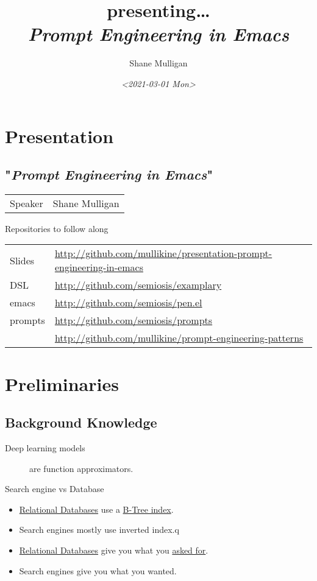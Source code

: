 \documentclass[presentation]{beamer}
\author{Shane Mulligan \\  }
\date{\textit{<2021-03-01 Mon>}}
\title{presenting\ldots{} \\   \emph{\alert{Prompt Engineering in Emacs}} \\  }
\begin{document}
\maketitle

\section{Presentation}
\label{sec:org67790be}
\subsection{"\emph{Prompt Engineering in Emacs}"}
\label{sec:org0ccc55f}
\begin{center}
\begin{tabular}{ll}
Speaker & Shane Mulligan\\
\end{tabular}
\end{center}

\begin{frame}[label={sec:org299757d}]{Repositories to follow along}
\begin{center}
\begin{tabular}{ll}
Slides & \url{http://github.com/mullikine/presentation-prompt-engineering-in-emacs}\\
DSL & \url{http://github.com/semiosis/examplary}\\
emacs & \url{http://github.com/semiosis/pen.el}\\
prompts & \url{http://github.com/semiosis/prompts}\\
 & \url{http://github.com/mullikine/prompt-engineering-patterns}\\
\end{tabular}
\end{center}
\end{frame}

\section{Preliminaries}
\label{sec:org44d37b2}
\subsection{Background Knowledge}
\label{sec:org04355f3}
\begin{description}
\item[{Deep learning models}] are function approximators.
\end{description}

\begin{frame}[label={sec:org3efe7c5}]{Search engine vs Database}
\begin{itemize}
\item \uline{Relational Databases} use a \uline{B-Tree index}.
\item \alert{Search engines} mostly use \alert{inverted index}.q
\item \uline{Relational Databases} give you what you \uline{asked for}.
\item \alert{Search engines} give you what you \alert{wanted}.
\end{itemize}
\end{frame}
\end{document}
